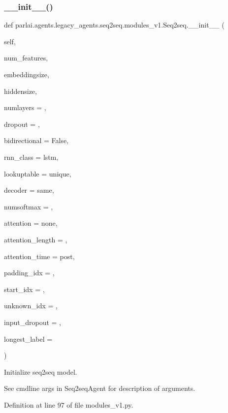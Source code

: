 \subsubsection{\texorpdfstring{\+\_\+\+\_\+init\+\_\+\+\_\+()}{\_\_init\_\_()}}
{\footnotesize\ttfamily def parlai.\+agents.\+legacy\+\_\+agents.\+seq2seq.\+modules\+\_\+v1.\+Seq2seq.\+\_\+\+\_\+init\+\_\+\+\_\+ (\begin{DoxyParamCaption}\item[{}]{self,  }\item[{}]{num\+\_\+features,  }\item[{}]{embeddingsize,  }\item[{}]{hiddensize,  }\item[{}]{numlayers = {},  }\item[{}]{dropout = {},  }\item[{}]{bidirectional = {\ttfamily False},  }\item[{}]{rnn\+\_\+class = {\ttfamily \textquotesingle{}lstm\textquotesingle{}},  }\item[{}]{lookuptable = {\ttfamily \textquotesingle{}unique\textquotesingle{}},  }\item[{}]{decoder = {\ttfamily \textquotesingle{}same\textquotesingle{}},  }\item[{}]{numsoftmax = {},  }\item[{}]{attention = {\ttfamily \textquotesingle{}none\textquotesingle{}},  }\item[{}]{attention\+\_\+length = {},  }\item[{}]{attention\+\_\+time = {\ttfamily \textquotesingle{}post\textquotesingle{}},  }\item[{}]{padding\+\_\+idx = {},  }\item[{}]{start\+\_\+idx = {},  }\item[{}]{unknown\+\_\+idx = {},  }\item[{}]{input\+\_\+dropout = {},  }\item[{}]{longest\+\_\+label = {} }\end{DoxyParamCaption})}

\begin{DoxyVerb}Initialize seq2seq model.

See cmdline args in Seq2seqAgent for description of arguments.
\end{DoxyVerb}
 

Definition at line 97 of file modules\+\_\+v1.\+py.


